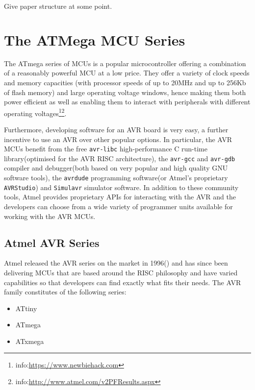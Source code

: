 \documentclass[12pt,a4paper,twocolumn]{article}
\begin{document}
	Give paper structure at some point.
	

\section{The ATMega MCU Series}
\label{sec:atmega_overview}
	The ATmega series of MCUs is a popular microcontroller offering a combination of a reasonably powerful MCU at a low price. They offer a variety of clock speeds and memory capacities (with processor speeds of up to 20MHz and up to 256Kb of flash memory) and large operating voltage windows, hence making them both power efficient as well as enabling them to interact with peripherals with different operating voltages\footnote{info:\href{https://www.newbiehack.com/MicrocontrollersAlternativePowerSources.aspx}{https://www.newbiehack.com}}\footnote{info:\href{http://www.atmel.com/v2PFResults.aspx}{http://www.atmel.com/v2PFResults.aspx}}.
	
	Furthermore, developing software for an AVR board is very easy, a further incentive to use an AVR over other popular options. In particular, the AVR MCUs benefit from the free \texttt{avr-libc} high-performance C run-time library(optimised for the AVR RISC architecture), the \texttt{avr-gcc} and \texttt{avr-gdb} compiler and debugger(both based on very popular and high quality GNU software tools), the \texttt{avrdude} programming software(or Atmel's proprietary \texttt{AVRStudio}) and \texttt{Simulavr} simulator software. In addition to these community tools, Atmel provides proprietary APIs for interacting with the AVR and the developers can choose from a wide variety of programmer units available for working with the AVR MCUs\cite{book:practical_avr}.
	
	\subsection{Atmel AVR Series}
	Atmel released the AVR series on the market in 1996(\cite{book:practical_avr}) and has since been delivering MCUs that are based around the RISC philosophy and have varied capabilities so that developers can find exactly what fits their needs. The AVR family constitutes of the following series:
	
	\begin{itemize}
		\item ATtiny \\
		\item ATmega \\
		\item ATxmega \\
	\end{itemize}
	
\end{document}
